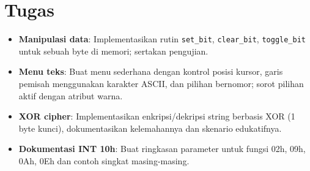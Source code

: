 \documentclass[../main.tex]{subfiles}
\begin{document}
\section{Tugas}
\begin{itemize}
  \item \textbf{Manipulasi data}: Implementasikan rutin \texttt{set\_bit}, \texttt{clear\_bit}, \texttt{toggle\_bit} untuk sebuah byte di memori; sertakan pengujian.
  \item \textbf{Menu teks}: Buat menu sederhana dengan kontrol posisi kursor, garis pemisah menggunakan karakter ASCII, dan pilihan bernomor; sorot pilihan aktif dengan atribut warna.
  \item \textbf{XOR cipher}: Implementasikan enkripsi/dekripsi string berbasis XOR (1 byte kunci), dokumentasikan kelemahannya dan skenario edukatifnya.
  \item \textbf{Dokumentasi INT 10h}: Buat ringkasan parameter untuk fungsi 02h, 09h, 0Ah, 0Eh dan contoh singkat masing-masing.
\end{itemize}
\end{document}
